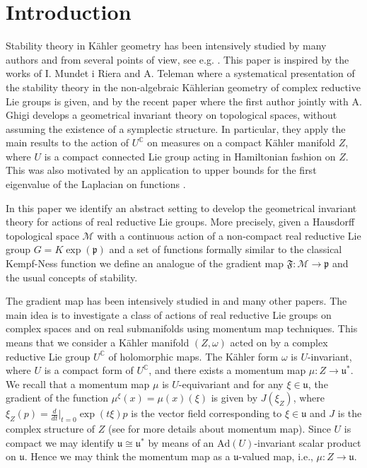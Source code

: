 \documentclass[leqno,11pt, a4]{amsart}
\theoremstyle{named}
\begin{document}
\section{Introduction}
\label{sec:introduction}
Stability theory in K\"ahler geometry has been intensively studied by many authors and from several points of view, see e.g. \cite{georgula,heinzner-GIT-stein,heinzner-huckleberry-Inventiones,heinzner-huckleberry-loose,heinzner-loose,kempf-ness,kirwan,mumford-GIT,sjamaar-Annals,schwartz}.
This paper is inspired by the works of I. Mundet i Riera \cite{mundet-Trans} and A. Teleman \cite{teleman-symplectic-stability} where a systematical presentation of the stability theory in the non-algebraic K\"ahlerian geometry of complex reductive Lie groups is given, and by the recent paper \cite{bgs} where the first author jointly with A. Ghigi
develops a geometrical invariant theory on topological spaces, without assuming the existence of a symplectic structure. In particular, they apply the main results to the action of $U^{\mathbb{C}}$ on measures on a compact K\"ahler manifold $Z$, where $U$ is a compact connected Lie group acting in Hamiltonian fashion on $Z$. This was also motivated by an application to upper bounds for the first eigenvalue of the Laplacian on functions \cite{arezzo-ghigi-loi,biliotti-ghigi-AIF,biliotti-ghigi-American,bourguignon-li-yau,hersch}.

In this paper we identify an  abstract setting to develop the  geometrical invariant theory for actions of real reductive Lie groups.
More precisely, given a Hausdorff topological space ${\mathscr{M}}$ with a continuous action of a non-compact real reductive  Lie group $G=K\exp ({\mathfrak{p}})$ and a set of functions formally similar to the classical Kempf-Ness
function  we define an analogue of the gradient map ${\mathfrak{F}}: {\mathscr{M}} {\longrightarrow} {\mathfrak{p}}$ and the usual concepts of stability.

The gradient map has been intensively studied in \cite{heinz-stoezel,heinzner-schwarz-Cartan,heinzner-schwarz-stoetzel,heinzner-schutzdeller} and many other papers. The main idea is to investigate
a class of actions of real reductive Lie groups on complex spaces and on real submanifolds using momentum map techniques. This means that we consider a K\"ahler manifold $(Z,\omega)$  acted on by a complex reductive
Lie group $U^{\mathbb{C}}$ of holomorphic maps. The K\"ahler form $\omega$ is $U$-invariant, where $U$ is a compact form of $U^{\mathbb{C}}$, and there exists a momentum map $\mu:Z {\longrightarrow} {\mathfrak{u}}^*$. We recall that a momentum map $\mu$ is $U$-equivariant and for any $\xi\in  {\mathfrak{u}}$, the gradient of the
function $\mu^\xi (x)=\mu(x)(\xi)$ is given by $J( \xi_Z )$, where $\xi_Z (p)=\frac{d}{dt}\vert_{t=0} \exp(t\xi)p$ is the vector field corresponding to $\xi \in {\mathfrak{u}}$ and $J$ is the complex structure of $Z$ (see \cite{heinzner-huckleberry-MSRI,mcduff-salamon-symplectic} for more details about momentum map).
Since $U$ is compact we may identify ${\mathfrak{u}} \cong {\mathfrak{u}}^*$ by means of an $\mathrm{Ad}(U)$-invariant scalar product on ${\mathfrak{u}}$. Hence we may think the momentum map as a ${\mathfrak{u}}$-valued map, i.e., $\mu:Z {\longrightarrow} {\mathfrak{u}}$.
\end{document}
